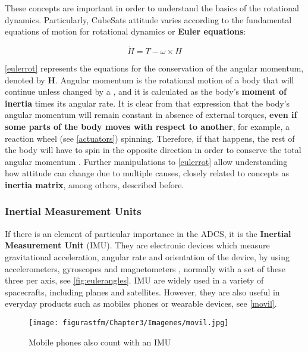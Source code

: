 			These concepts are important in order to understand the basics of the rotational dynamics. Particularly, CubeSats attitude varies according to the fundamental equations of motion for rotational dynamics or \textbf{Euler equations}:

\begin{equation}\label{eulerrot}
\dot{H} = T-\omega\times H
\end{equation}

\autoref{eulerrot} represents the equations for the conservation of the angular momentum, denoted by \textbf{H}. Angular momentum is the rotational motion of a body that will continue unless changed by a , and it is calculated as the body's \textbf{moment of inertia} times its angular rate. It is clear from that expression that the body's angular momentum will remain constant in absence of external torques, \textbf{even if some parts of the body moves with respect to another}, for example, a reaction wheel (see \autoref{actuators}) spinning. Therefore, if that happens, the rest of the body will have to spin in the opposite direction in order to conserve the total angular momentum \cite{smad}. Further manipulations to \autoref{eulerrot} allow understanding how attitude can change due to multiple causes, closely related to concepts as \textbf{inertia matrix}, among others, described before.
			
			

\subsubsection{Inertial Measurement 
Units} \label{imus}

If there is an element of particular importance in the \acrshort{ADCS}, it is the \textbf{Inertial Measurement Unit} (\acrshort{IMU}). They are electronic devices which measure gravitational acceleration, angular rate and orientation of the device, by using accelerometers, gyroscopes and magnetometers \cite{wiki}, normally with a set of these three per axis, see \autoref{fig:eulerangles}. \acrshort{IMU} are widely used in a variety of spacecrafts, including planes and satellites. However, they are also useful in everyday products such as mobiles phones or wearable devices, see \autoref{movil}.


\begin{figure}[H]
				\centering
				\texttt{[image: figurastfm/Chapter3/Imagenes/movil.jpg]}
				\caption{Mobile phones also count with an \acrshort{IMU} \cite{sentinel}}
				\label{movil}
				\vspace{-2cm}
			\end{figure}
			
